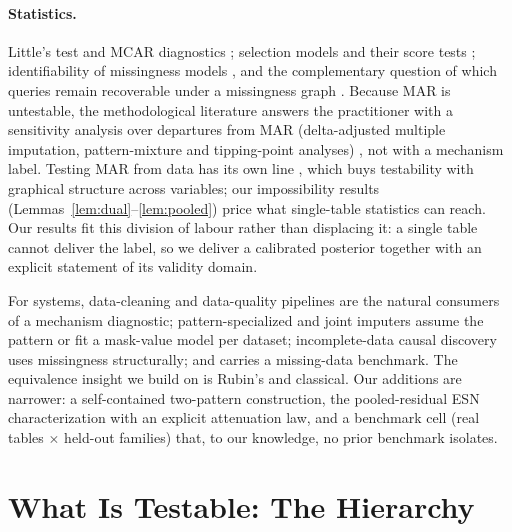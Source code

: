 \documentclass[conference]{IEEEtran}
\begin{document}
\paragraph{Statistics.}
Little's test and MCAR diagnostics \cite{little1988}; selection models and their score tests
\cite{heckman1979,dk1994}; identifiability of missingness models
\cite{rubin1976,seaman2013,mk2007,ceriscioli2026}, and the complementary question of which
queries remain recoverable under a missingness graph \cite{mohanpearl2021}. Because MAR is
untestable, the methodological literature answers the practitioner with a sensitivity analysis
over departures from MAR (delta-adjusted multiple imputation, pattern-mixture and tipping-point
analyses) \cite{mk2007,noonan2022}, not with a mechanism label. Testing MAR
from data has its own line \cite{tian2015}, which buys testability with graphical structure
across variables; our impossibility results (Lemmas~\ref{lem:dual}--\ref{lem:pooled}) price
what single-table statistics can reach. Our results fit this
division of labour rather than displacing it: a single table cannot deliver the label, so we
deliver a calibrated posterior together with an explicit statement of its validity domain.

For systems, data-cleaning and data-quality pipelines \cite{holoclean2017} are the natural
consumers of a mechanism diagnostic; pattern-specialized and joint imputers
\cite{feitelberg2025,diffjoint2026,missbgm2026,tabsoda2026} assume the pattern or fit a mask-value
model per dataset; incomplete-data causal discovery \cite{missnodag2026,misscnf2026,pairci2026}
uses missingness structurally; and \cite{feitelberg2025} carries a missing-data benchmark. The
equivalence insight we build on is Rubin's and classical. Our additions are narrower: a
self-contained two-pattern construction, the pooled-residual ESN characterization with an explicit
attenuation law, and a benchmark cell (real tables $\times$ held-out families) that, to our
knowledge, no prior benchmark isolates.


\section{What Is Testable: The Hierarchy}\label{sec:theory}
\end{document}

